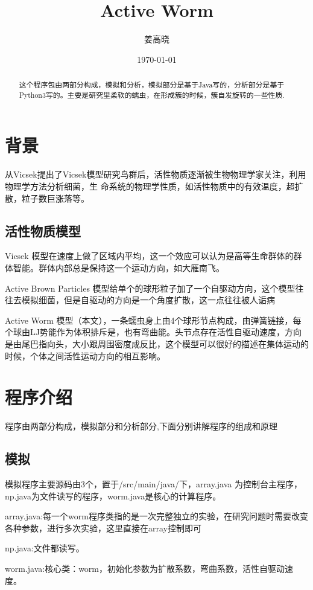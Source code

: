 \documentclass{article}
\begin{document}
\begin{CJK}{UTF8}{gkai}
\title{Active Worm}
\author{姜高晓}
\date{\today}
\maketitle
\begin{abstract}
这个程序包由两部分构成，模拟和分析，模拟部分是基于Java写的，分析部分是基于Python3写的。主要是研究里柔软的蠕虫，在形成簇的时候，簇自发旋转的一些性质.
\end{abstract}

\section{背景}
	从Vicsek提出了Vicsek模型研究鸟群后，活性物质逐渐被生物物理学家关注，利用物理学方法分析细菌，生
命系统的物理学性质，如活性物质中的有效温度，超扩散，粒子数巨涨落等。
\subsection{活性物质模型}
	Vicsek 模型在速度上做了区域内平均，这一个效应可以认为是高等生命群体的群体智能。群体内部总是保持这一个运动方向，如大雁南飞。

	Active Brown Particles 模型给单个的球形粒子加了一个自驱动方向，这个模型往往去模拟细菌，但是自驱动的方向是一个角度扩散，这一点往往被人诟病

	Active Worm 模型（本文），一条蠕虫身上由4个球形节点构成，由弹簧链接，每个球由LJ势能作为体积排斥是，也有弯曲能。头节点存在活性自驱动速度，方向是由尾巴指向头，大小跟周围密度成反比，这个模型可以很好的描述在集体运动的时候，个体之间活性运动方向的相互影响。
\section{程序介绍}
	程序由两部分构成，模拟部分和分析部分,下面分别讲解程序的组成和原理
\subsection{模拟}
        模拟程序主要源码由3个，置于/src/main/java/下，array.java 为控制台主程序，np.java为文件读写的程序，worm.java是核心的计算程序。
	
	array.java:每一个worm程序类指的是一次完整独立的实验，在研究问题时需要改变各种参数，进行多次实验，这里直接在array控制即可

	np.java:文件都读写。

	worm.java:核心类：worm，初始化参数为扩散系数，弯曲系数，活性自驱动速度。


\end{CJK}
\end{document}
